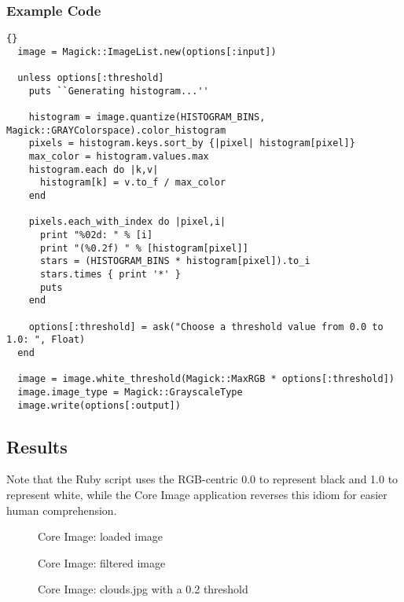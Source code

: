 \documentclass[11pt]{article}
\begin{document}
\subsubsection{Example Code}

\begin{lstlisting}[frame=trbl]{}
  image = Magick::ImageList.new(options[:input])

  unless options[:threshold]
    puts ``Generating histogram...''
  
    histogram = image.quantize(HISTOGRAM_BINS, Magick::GRAYColorspace).color_histogram
    pixels = histogram.keys.sort_by {|pixel| histogram[pixel]}
    max_color = histogram.values.max
    histogram.each do |k,v|
      histogram[k] = v.to_f / max_color
    end

    pixels.each_with_index do |pixel,i|
      print "%02d: " % [i]
      print "(%0.2f) " % [histogram[pixel]]
      stars = (HISTOGRAM_BINS * histogram[pixel]).to_i
      stars.times { print '*' }
      puts
    end

    options[:threshold] = ask("Choose a threshold value from 0.0 to 1.0: ", Float)
  end

  image = image.white_threshold(Magick::MaxRGB * options[:threshold])
  image.image_type = Magick::GrayscaleType
  image.write(options[:output])
\end{lstlisting}

\newpage

\subsection{Results}

Note that the Ruby script uses the RGB-centric 0.0 to represent black and 1.0 to represent white, while the Core Image application reverses this idiom for easier human comprehension.

\begin{figure}[h]
\centering
{}
\caption{Core Image: loaded image}
\end{figure}

\begin{figure}[h]
\centering
{}
\caption{Core Image: filtered image}
\end{figure}

\begin{figure}[h]
\centering
{}
\caption{Core Image: clouds.jpg with a 0.2 threshold}
\end{figure}
\end{document}
